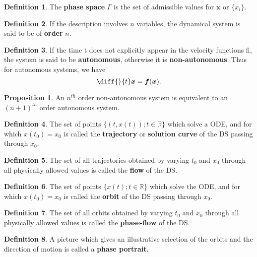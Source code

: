 \documentclass[12pt, a4paper]{article}
\newcommand{\bb}[1]{\mathbb{#1}}
\theoremstyle{definition}
\newtheorem{definition}{Definition}[section]
\newtheorem{proposition}{Proposition}
\theoremstyle{plain}
\begin{document}
\begin{definition}
The \textbf{phase space} $\Gamma$ is the set of admissible values for $\bm{x}$ or $\{x_i\}.$
\end{definition}

\begin{definition}
If the description involves $n$ variables, the dynamical system is said to be of \textbf{order} $n.$
\end{definition}

\begin{definition}
If the time t does not explicitly appear in the velocity functions fi, the system is said to be \textbf{autonomous}, otherwise it is \textbf{non-autonomous}. Thus for autonomous systems, we have $$\diff{}{t}\bm{x}=\bm{f}(\bm{x}).$$
\end{definition}

\begin{proposition}
 An $n^{th}$ order non-autonomous system is equivalent to an $(n+1)^{th}$ order autonomous system.
\end{proposition}

\begin{definition}
The set of points $\{(t,x(t)); t \in \bb{R}\}$ which solve a ODE, and for which $x(t_0) = x_0$ is called the \textbf{trajectory} or \textbf{solution curve} of the DS passing through $x_0.$
\end{definition}

\begin{definition}
The set of all trajectories obtained by varying $t_0$ and $x_0$ through all physically allowed values is called the \textbf{flow} of the DS.
\end{definition}

\begin{definition}
The set of points $\{x(t); t \in \bb{R}\}$ which solve the ODE, and for which $x(t_0) = x_0$ is called the \textbf{orbit} of the DS passing through $x_0.$ 
\end{definition}

\begin{definition}
The set of all orbits obtained by varying $t_0$ and $x_0$ through all physically allowed values is called the \textbf{phase-flow} of the DS. 
\end{definition}

\begin{definition}
A picture which gives an illustrative selection of the orbits and the direction of motion is called a \textbf{phase portrait}.
\end{definition}
\end{document}
